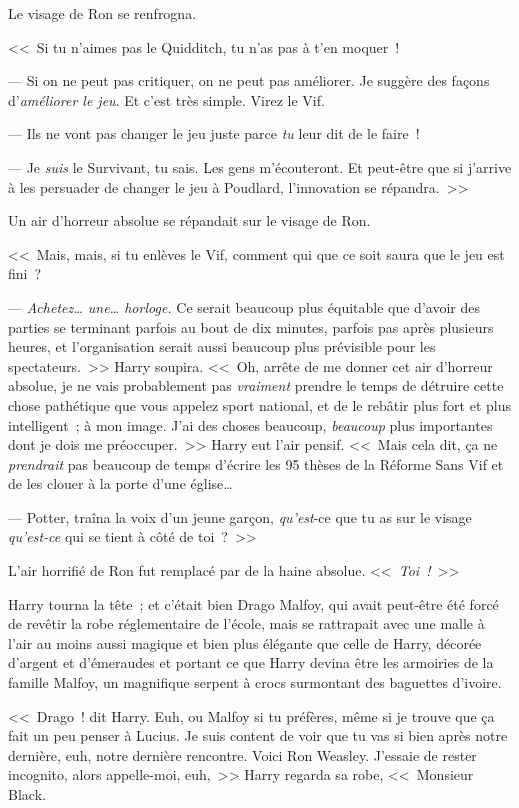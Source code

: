 Le visage de Ron se renfrogna. 

<<~Si tu n'aimes pas le Quidditch, tu n'as pas à t'en moquer~!

--- Si on ne peut pas critiquer, on ne peut pas améliorer. Je suggère des façons d'\emph{améliorer le jeu}. Et c'est très simple. Virez le Vif.

--- Ils ne vont pas changer le jeu juste parce \emph{tu} leur dit de le faire~!

--- Je \emph{suis} le Survivant, tu sais. Les gens m'écouteront. Et peut-être que si j'arrive à les persuader de changer le jeu à Poudlard, l'innovation se répandra.~>>

Un air d'horreur absolue se répandait sur le visage de Ron. 

<<~Mais, mais, si tu enlèves le Vif, comment qui que ce soit saura que le jeu est fini~?

--- \emph{Achetez… une… horloge.} Ce serait beaucoup plus équitable que d'avoir des parties se terminant parfois au bout de dix minutes, parfois pas après plusieurs heures, et l'organisation serait aussi beaucoup plus prévisible pour les spectateurs.~>> Harry soupira. <<~Oh, arrête de me donner cet air d'horreur absolue, je ne vais probablement pas \emph{vraiment} prendre le temps de détruire cette chose pathétique que vous appelez sport national, et de le rebâtir plus fort et plus intelligent~; à mon image. J'ai des choses beaucoup, \emph{beaucoup} plus importantes dont je dois me préoccuper.~>> Harry eut l'air pensif. <<~Mais cela dit, ça ne \emph{prendrait} pas beaucoup de temps d'écrire les 95 thèses de la Réforme Sans Vif et de les clouer à la porte d'une église…

--- Potter, traîna la voix d'un jeune garçon, \emph{qu'est}-ce que tu as sur le visage \emph{qu'est-ce} qui se tient à côté de toi~?~>>

L'air horrifié de Ron fut remplacé par de la haine absolue. <<~\emph{Toi~!}~>>

Harry tourna la tête~; et c'était bien Drago Malfoy, qui avait peut-être été forcé de revêtir la robe réglementaire de l'école, mais se rattrapait avec une malle à l'air au moins aussi magique et bien plus élégante que celle de Harry, décorée d'argent et d'émeraudes et portant ce que Harry devina être les armoiries de la famille Malfoy, un magnifique serpent à crocs surmontant des baguettes d'ivoire.

<<~Drago~! dit Harry. Euh, ou Malfoy si tu préfères, même si je trouve que ça fait un peu penser à Lucius. Je suis content de voir que tu vas si bien après notre dernière, euh, notre dernière rencontre. Voici Ron Weasley. J'essaie de rester incognito, alors appelle-moi, euh,~>> Harry regarda sa robe, <<~Monsieur Black.


